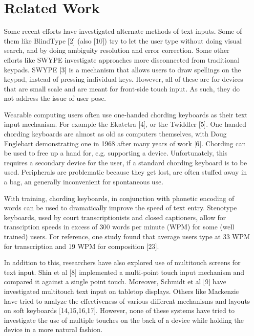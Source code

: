 \section{Related Work}

Some recent efforts have investigated alternate methods of text
inputs. Some of them like BlindType [2] (also [10]) try to let the
user type without doing visual search, and by doing ambiguity
resolution and error correction. Some other efforts like SWYPE
investigate approaches more disconnected from traditional
keypads. SWYPE [3] is a mechanism that allows users to draw spellings
on the keypad, instead of pressing individual keys. However, all of
these are for devices that are small scale and are meant for
front-side touch input.  As such, they do not address the issue of
user pose.

Wearable computing users often use one-handed chording keyboards as
their text input mechanism.  For example the Ekatetra [4], or the Twiddler [5].  One handed chording keyboards are almost
as old as computers themselves, with Doug Englebart demonstrating one
in 1968 after many years of work [6]. Chording can be
used to free up a hand for, e.g. supporting a device.  Unfortunately,
this requires a secondary device for the user, if a standard chording
keyboard is to be used.  Peripherals are problematic because they get
lost, are often stuffed away in a bag, an generally inconvenient for
spontaneous use.

With training, chording keyboards, in conjunction with phonetic
encoding of words can be used to dramatically improve the speed of
text entry.  Stenotype keyboards, used by court transcriptionists and
closed captioners, allow for transciption speeds in excess of 300
words per minute (WPM) for some (well trained) users.  For reference,
one study found that average users type at 33 WPM for transcription
and 19 WPM for composition [23].

In addition to this, researchers have also explored use of multitouch
screens for text input. Shin et al [8] implemented a multi-point touch
input mechanism and compared it against a single point
touch. Moreover, Schmidt et al [9] have investigated multitouch text
input on tabletop displays. Others like Mackenzie have tried to
analyze the effectiveness of various different mechanisms and layouts
on soft keyboards [14,15,16,17]. However, none of these systems have
tried to investigate the use of multiple touches on the back of a
device while holding the device in a more natural fashion.
